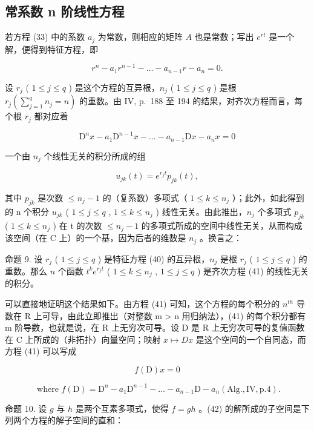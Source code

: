 \subsection{常系数 n 阶线性方程}

若方程 (33) 中的系数 \(a_{j}\) 为常数，则相应的矩阵 \(A\) 也是常数；写出 \(e^{rt}\) 是一个解，便得到特征方程，即

\[
r ^ {n} - a _ {1} r ^ {n - 1} - \ldots - a _ {n - 1} r - a _ {n} = 0.\tag{40}
\]

设 \(r_j\) ( \(1 \leqslant j \leqslant q\) ) 是这个方程的互异根，\(n_j\) ( \(1 \leqslant j \leqslant q\) ) 是根 \(r_j \left( \sum_{j=1}^{q} n_j = n \right)\) 的重数。由 IV, p.~188 至 194 的结果，对齐次方程而言，每个根 \(r_j\) 都对应着

\[
\mathrm{D} ^ {n} x - a _ {1} \mathrm{D} ^ {n - 1} x - \dots - a _ {n - 1} \mathrm{D} x - a _ {n} x = 0\tag{41}
\]

一个由 \(n_j\) 个线性无关的积分所成的组

\[
u _ {j k} (t) = e ^ {r _ {j} t} p _ {j k} (t),
\]

其中 \(p_{jk}\) 是次数 \(\leqslant n_{j}-1\) 的（复系数）多项式（ \(1\leqslant k\leqslant n_{j}\) ）；此外，如此得到的 n 个积分 \(u_{jk}\) ( \(1\leqslant j\leqslant q\) , \(1\leqslant k\leqslant n_{j}\) ) 线性无关。由此推出，\(n_{j}\) 个多项式 \(p_{jk}\) ( \(1\leqslant k\leqslant n_{j}\) ) 在 t 的次数 \(\leqslant n_{j}-1\) 的多项式所成的空间中线性无关，从而构成该空间（在 C 上）的一个基，因为后者的维数是 \(n_{j}\) 。换言之：

命题 9. 设 \(r_j\) ( \(1 \leqslant j \leqslant q\) ) 是特征方程 (40) 的互异根，\(n_j\) 是根 \(r_j\) ( \(1 \leqslant j \leqslant q\) ) 的重数。那么 \(n\) 个函数 \(t^k e^{r_j t}\) ( \(1 \leqslant k \leqslant n_j\) , \(1 \leqslant j \leqslant q\) ) 是齐次方程 (41) 的线性无关的积分。

可以直接地证明这个结果如下。由方程 (41) 可知，这个方程的每个积分的 \(n^{th}\) 导数在 R 上可导，由此立即推出（对整数 m \textgreater{} n 用归纳法），(41) 的每个积分都有 m 阶导数，也就是说，在 R 上无穷次可导。设 D 是 R 上无穷次可导的复值函数在 C 上所成的（非拓扑）向量空间；映射 \(x \mapsto Dx\) 是这个空间的一个自同态，而方程 (41) 可以写成

\[
f (\mathrm{D}) x = 0\tag{42}
\]

\[
\text { where } f (\mathrm{D}) = \mathrm{D} ^ {n} - a _ {1} \mathrm{D} ^ {n - 1} - \dots - a _ {n - 1} \mathrm{D} - a _ {n} (\mathrm{Alg}., \mathrm{IV}, \mathrm{p}. 4).
\]

命题 10. 设 \(g\) 与 \(h\) 是两个互素多项式，使得 \(f = gh\) 。(42) 的解所成的子空间是下列两个方程的解子空间的直和：


